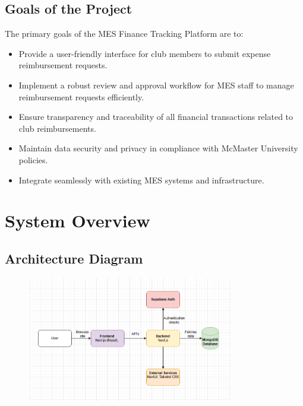 \documentclass[12pt]{article}
\begin{document}
  \subsection{Goals of the Project}
    The primary goals of the MES Finance Tracking Platform are to:
    \begin{itemize}
      \item Provide a user-friendly interface for club members to submit expense reimbursement requests.
      \item Implement a robust review and approval workflow for MES staff to manage reimbursement requests efficiently.
      \item Ensure transparency and traceability of all financial transactions related to club reimbursements.
      \item Maintain data security and privacy in compliance with McMaster University policies.
      \item Integrate seamlessly with existing MES systems and infrastructure.
    \end{itemize}

\section{System Overview}

  \subsection{Architecture Diagram}
    \begin{figure}[H]
        \centering
        \includegraphics[width=0.8\textwidth]{architecture_diagram_Justin.png}
        \label{fig:architecture_diagram}
    \end{figure}
\end{document}

